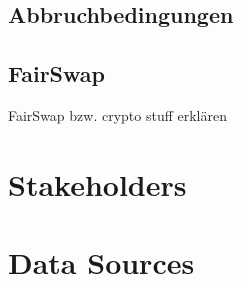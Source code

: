 \subsection{Abbruchbedingungen}
\label{subsection:cancel}

\subsection{FairSwap}
\label{subsection:fairswap}

FairSwap bzw. crypto stuff erklären

\section{Stakeholders}
\label{section:stakeholders}

\section{Data Sources}
\label{section:datasource}



